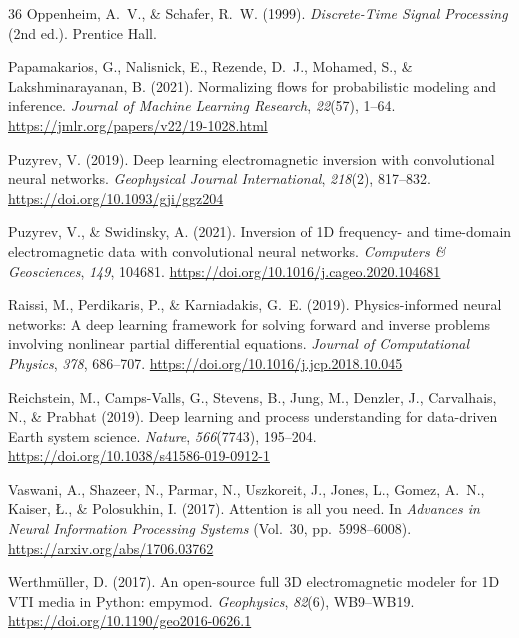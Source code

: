 \documentclass[journal]{IEEEtran}
\begin{document}
\begin{thebibliography}{36}
Oppenheim, A.~V., \& Schafer, R.~W. (1999).
\textit{Discrete-Time Signal Processing} (2nd ed.). Prentice Hall.

Papamakarios, G., Nalisnick, E., Rezende, D.~J., Mohamed, S., \&
Lakshminarayanan, B. (2021).
Normalizing flows for probabilistic modeling and inference.
\textit{Journal of Machine Learning Research}, \textit{22}(57),
1--64.
\url{https://jmlr.org/papers/v22/19-1028.html}

Puzyrev, V. (2019).
Deep learning electromagnetic inversion with convolutional neural
networks.
\textit{Geophysical Journal International}, \textit{218}(2),
817--832.
\url{https://doi.org/10.1093/gji/ggz204}

Puzyrev, V., \& Swidinsky, A. (2021).
Inversion of 1D frequency- and time-domain electromagnetic data
with convolutional neural networks.
\textit{Computers \& Geosciences}, \textit{149}, 104681.
\url{https://doi.org/10.1016/j.cageo.2020.104681}

Raissi, M., Perdikaris, P., \& Karniadakis, G.~E. (2019).
Physics-informed neural networks: A deep learning framework for
solving forward and inverse problems involving nonlinear partial
differential equations.
\textit{Journal of Computational Physics}, \textit{378}, 686--707.
\url{https://doi.org/10.1016/j.jcp.2018.10.045}

Reichstein, M., Camps-Valls, G., Stevens, B., Jung, M.,
Denzler, J., Carvalhais, N., \& Prabhat (2019).
Deep learning and process understanding for data-driven Earth
system science.
\textit{Nature}, \textit{566}(7743), 195--204.
\url{https://doi.org/10.1038/s41586-019-0912-1}

Vaswani, A., Shazeer, N., Parmar, N., Uszkoreit, J., Jones, L.,
Gomez, A.~N., Kaiser, {\L}., \& Polosukhin, I. (2017).
Attention is all you need.
In \textit{Advances in Neural Information Processing Systems}
(Vol.~30, pp.~5998--6008).
\url{https://arxiv.org/abs/1706.03762}

Werthm{\"u}ller, D. (2017).
An open-source full 3D electromagnetic modeler for 1D VTI media in
Python: empymod.
\textit{Geophysics}, \textit{82}(6), WB9--WB19.
\url{https://doi.org/10.1190/geo2016-0626.1}


\end{thebibliography}
\end{document}
